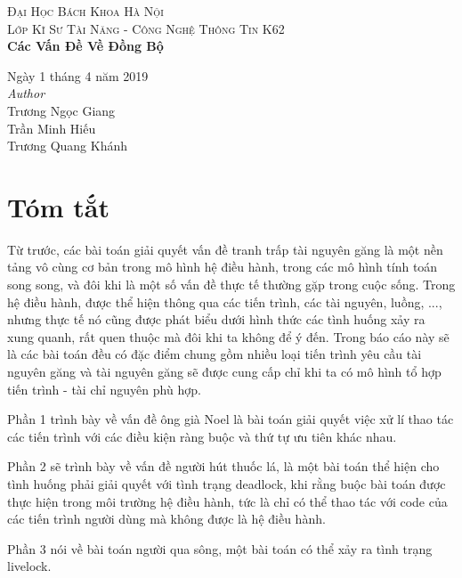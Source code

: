 \documentclass[a4paper]{article}
\begin{document}
\textsc{\LARGE Đại Học Bách Khoa Hà Nội} \\[1,5cm]
	\textsc{\large Lớp Kĩ Sư Tài Năng - Công Nghệ Thông Tin K62} \\[0.5cm]
	{\huge\bfseries Các Vấn Đề Về Đồng Bộ}\\[0.4cm] 
	
		\begin{flushleft}
			\large
			Ngày 1 tháng 4 năm 2019 \\[0.5cm]
			\textit{Author}\\[0,3cm]
			   Trương Ngọc Giang \\
			   Trần Minh Hiếu  \\
			   Trương Quang Khánh \\
		\end{flushleft}
		

		
	\section*{Tóm tắt}
	Từ trước, các bài toán giải quyết vấn đề tranh trấp tài nguyên găng là một nền tảng vô cùng cơ bản trong 
	mô hình hệ điều hành, trong các mô hình tính toán song song, và đôi khi là một số vấn đề thực tế thường gặp
	trong cuộc sống. Trong hệ điều hành, được thể hiện thông qua các tiến trình, các tài nguyên, luồng, ..., 
	nhưng thực tế nó cũng được phát biểu dưới hình thức các tình huống xảy ra xung quanh, rất quen thuộc mà 
	đôi khi ta không để ý đến. Trong báo cáo này sẽ là các bài toán đều có đặc điểm chung gồm nhiều loại tiến 
	trình yêu cầu tài nguyên găng và tài nguyên găng sẽ được cung cấp chỉ khi ta có mô hình tổ hợp tiến trình - tài chỉ
	nguyên phù hợp. 
	
	Phần 1 trình bày về vấn đề ông già Noel là bài toán giải quyết việc xử lí thao tác các tiến trình với các điều kiện ràng buộc và thứ tự ưu tiên khác nhau.
	
	Phần 2 sẽ trình bày về vấn đề người hút thuốc lá, là một bài
	toán thể hiện cho tình huống phải giải quyết với tình trạng deadlock, khi rằng buộc bài toán được thực hiện
	trong môi trường hệ điều hành, tức là chỉ có thể thao tác với code của các tiến trình người dùng mà không 
	được là hệ điều hành. 
	
	Phần 3 nói về bài toán người qua sông, một bài toán có thể xảy ra tình trạng livelock.
	
	\newpage
	
	\tableofcontents
	\newpage

	
\end{document}
